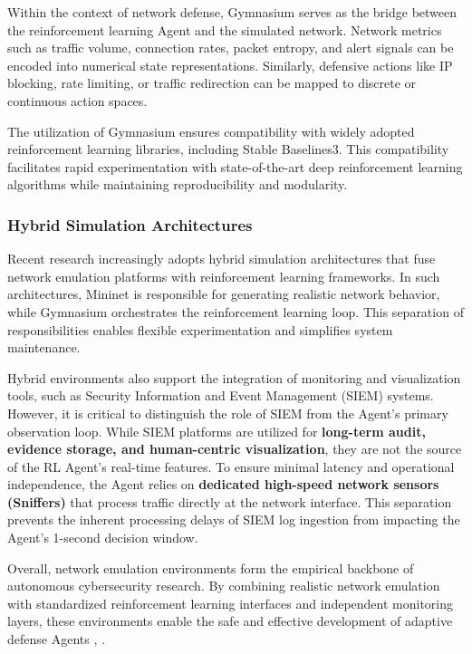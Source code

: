 \documentclass[12pt,a4paper]{report}
\begin{document}
Within the context of network defense, Gymnasium serves as the bridge between the reinforcement learning Agent and the simulated network. Network metrics such as traffic volume, connection rates, packet entropy, and alert signals can be encoded into numerical state representations. Similarly, defensive actions like IP blocking, rate limiting, or traffic redirection can be mapped to discrete or continuous action spaces.

The utilization of Gymnasium ensures compatibility with widely adopted reinforcement learning libraries, including Stable Baselines3. This compatibility facilitates rapid experimentation with state-of-the-art deep reinforcement learning algorithms while maintaining reproducibility and modularity.

\subsubsection*{Hybrid Simulation Architectures}

Recent research increasingly adopts hybrid simulation architectures that fuse network emulation platforms with reinforcement learning frameworks. In such architectures, Mininet is responsible for generating realistic network behavior, while Gymnasium orchestrates the reinforcement learning loop. This separation of responsibilities enables flexible experimentation and simplifies system maintenance.

Hybrid environments also support the integration of monitoring and visualization tools, such as Security Information and Event Management (SIEM) systems. However, it is critical to distinguish the role of SIEM from the Agent's primary observation loop. While SIEM platforms are utilized for \textbf{long-term audit, evidence storage, and human-centric visualization}, they are not the source of the RL Agent's real-time features. To ensure minimal latency and operational independence, the Agent relies on \textbf{dedicated high-speed network sensors (Sniffers)} that process traffic directly at the network interface. This separation prevents the inherent processing delays of SIEM log ingestion from impacting the Agent's 1-second decision window.

Overall, network emulation environments form the empirical backbone of autonomous cybersecurity research. By combining realistic network emulation with standardized reinforcement learning interfaces and independent monitoring layers, these environments enable the safe and effective development of adaptive defense Agents \cite{lantzMininet2010}, \cite{gymnasium2023}.
\end{document}
